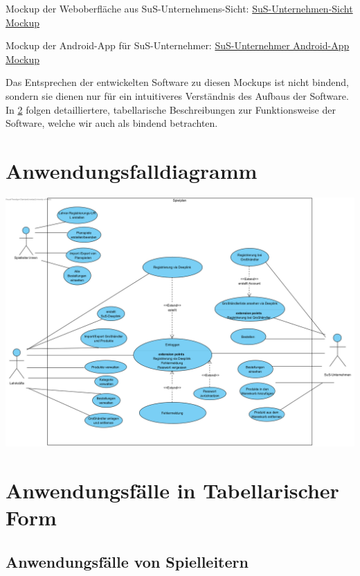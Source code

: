 Mockup der Weboberfläche aus SuS-Unternehmens-Sicht: \href{https://www.figma.com/proto/J6wDnjPfZRockWqW8Hru8f/Untitled?page-id=85%3A2840&type=design&node-id=85-3174&viewport=920%2C336%2C0.14&t=vbKEeDjeuEgnx2sG-1&scaling=min-zoom&starting-point-node-id=85%3A3174}{SuS-Unternehmen-Sicht Mockup}

Mockup der Android-App für SuS-Unternehmer: \href{https://www.figma.com/proto/J6wDnjPfZRockWqW8Hru8f/Untitled?page-id=78%3A2348&type=design&node-id=78-2592&viewport=685%2C411%2C0.35&t=vrfZ5igwusJ8psCc-1&scaling=min-zoom&starting-point-node-id=78%3A2592}{SuS-Unternehmer Android-App Mockup}

\bigskip
Das Entsprechen der entwickelten Software zu diesen Mockups ist nicht bindend, sondern sie dienen nur für ein intuitiveres Verständnis des Aufbaus der Software. In \ref{af-tabellen} folgen detailliertere, tabellarische Beschreibungen zur Funktionsweise der Software, welche wir auch als bindend betrachten.

\section{Anwendungsfalldiagramm}
\includegraphics[width=\textwidth,height=0.65\textheight]{img/Planspiel}

\section{Anwendungsfälle in Tabellarischer Form} \label{af-tabellen}
\subsection{Anwendungsfälle von Spielleitern}

